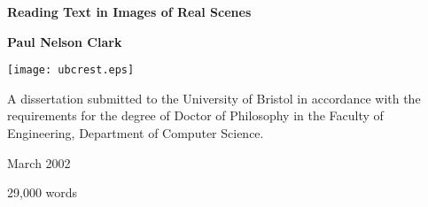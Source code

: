 \documentclass[11pt,a4paper]{report}
\begin{document}
\pagestyle{empty}


\begin{center}
\LARGE{\bf Reading Text in Images of Real Scenes}
\end{center}
\vspace{0.5in}
\begin{center}
\large{\bf Paul Nelson Clark}
\end{center}
\vspace{0.5in}
\begin{center}
\texttt{[image: ubcrest.eps]}
\end{center}
\vspace{0.5in}
\begin{center}
A dissertation submitted to the University of Bristol in accordance with the
requirements for the degree of Doctor of Philosophy in the Faculty of
Engineering, Department of Computer Science.
\end{center}
\vspace{0.18in}
\begin{center}
March 2002
\end{center}
\vspace{1.0in} \hfill 29,000 words \quad \quad



\pagestyle{plain}

\tableofcontents
\newpage

\listoffigures
\newpage

\listoftables
\newpage





% 

% 

% 

% 

% 
\end{document}
